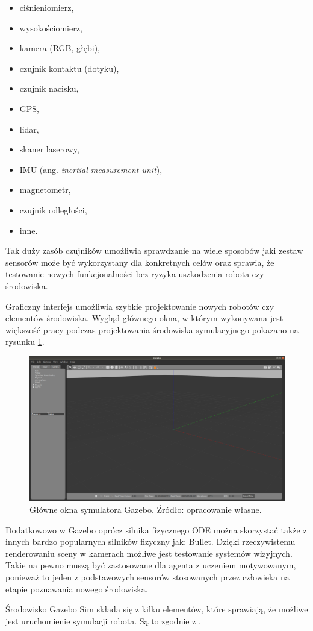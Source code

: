 \begin{itemize}
    \item ciśnieniomierz,
    \item wysokościomierz,
    \item kamera (RGB, głębi),
    \item czujnik kontaktu (dotyku),
    \item czujnik nacisku,
    \item GPS,
    \item lidar,
    \item skaner laserowy,
    \item IMU (ang. \textit{inertial measurement unit}),
    \item magnetometr,
    \item czujnik odległości,
    \item inne.
\end{itemize}

Tak duży zasób czujników umożliwia sprawdzanie na wiele sposobów jaki zestaw 
sensorów może być wykorzystany dla konkretnych celów oraz sprawia, że testowanie
nowych funkcjonalności bez ryzyka uszkodzenia robota czy środowiska. 

Graficzny interfejs umożliwia szybkie projektowanie nowych robotów czy elementów
środowiska. Wygląd głównego okna, w którym wykonywana jest większość pracy
podczas projektowania środowiska symulacyjnego pokazano na rysunku 
\ref{fig:gazebo_main_window}.

\begin{figure}[h]
    \centering
    \includegraphics[width=0.7\linewidth]{rozdzial5/images/gazebo_main_window}
    \caption{Główne okna symulatora Gazebo. Źródło: opracowanie własne.}
    \label{fig:gazebo_main_window}
\end{figure}

Dodatkowowo w Gazebo oprócz silnika fizycznego ODE można skorzystać także z innych
bardzo popularnych silników fizyczny jak: Bullet. Dzięki rzeczywistemu renderowaniu
sceny w kamerach możliwe jest testowanie systemów wizyjnych. Takie na pewno
muszą być zastosowane dla agenta z uczeniem motywowanym, ponieważ to jeden
z podstawowych sensorów stosowanych przez człowieka na etapie poznawania nowego
środowiska.

Środowisko Gazebo Sim składa się z kilku elementów, które sprawiają, że możliwe
jest uruchomienie symulacji robota. Są to zgodnie z \cite{gazebo_components}.

